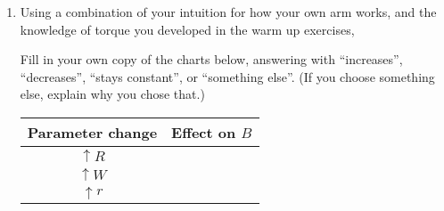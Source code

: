 \begin{enumerate}[labproc]
\item \label{proc:predict-RrW}
Using a combination of your intuition for how your own arm works,
and the knowledge of torque you developed in the warm up exercises,

Fill in your own copy of the charts below, 
answering with ``increases'', ``decreases'', 
``stays constant'', or ``something else''.  
(If you choose something else, explain why you chose that.)
\vspace{.5cm}
\\
\begin{tabular}{|c||c|}
	\hline
	Parameter change & Effect on $B$ 
	\\ \hline \hline
	$\uparrow R$ 
	& %
	\hphantom{Here is some text that is a bit long}
	\\ \hline
	$\uparrow W$ 
	& %
	\\ \hline
	$\uparrow r$
	&
	\\ \hline
\end{tabular}\\
\begin{comment}
\vspace{1cm}
\begin{tabular}{|c||c|c|c|}
	\hline
	Parameter change & Effect on $B$ 
	& Effect on value of $B$ when $H=0$
	& Effect on $\Delta B/\Delta H$ 
	\\ \hline \hline
	$\uparrow r$ 
	& & & 
	\\ \hline
\end{tabular}
\end{comment}

\begin{comment}
Consider two of the quantities above, 
(a) the value of $B$ when $H=0$ 
and (b) $\Delta B/\Delta H$.
\question{
Do either or both of these quantities
correspond to the slope and/or vertical intercept of your graph?}

\TODO{Students get far too confused about which slope they're measuring.
This struggle probably doesn't do much to advance our learning outcomes.}
\end{comment}



\end{enumerate}
